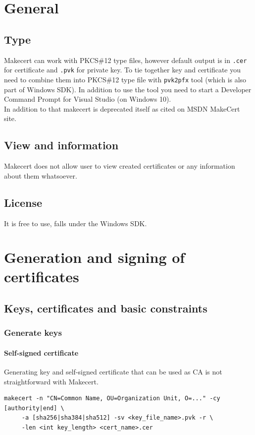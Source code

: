 \documentclass[10pt, a4paper]{report}
\begin{document}
\section{General}

  \subsection{Type}
Makecert can work with PKCS\#12 type files, however  default output is in \verb+.cer+ for certificate and \verb+.pvk+ for private key. To tie together key and certificate you need to combine them into PKCS\#12 type file with \verb+pvk2pfx+ tool (which is also part of Windows SDK). In addition to use the tool you need to start a Developer Command Prompt for Visual Studio (on Windows 10). 
\\ 
In addition to that makecert is deprecated itself as cited on MSDN MakeCert site.
  \subsection{View and information}
Makecert does not allow user to view created certificates or any information about them whatsoever.
  \subsection{License}
It is free to use, falls under the Windows SDK.
  
\section{Generation and signing of certificates}

  \subsection{Keys, certificates and basic constraints}
  
    \subsubsection{Generate keys}

      \paragraph{Self-signed certificate}
Generating key and self-signed certificate that can be used as CA is not straightforward with Makecert.
\begin{verbatim}
makecert -n "CN=Common Name, OU=Organization Unit, O=..." -cy [authority|end] \
	 -a [sha256|sha384|sha512] -sv <key_file_name>.pvk -r \
	 -len <int key_length> <cert_name>.cer
\end{verbatim}
\end{document}
